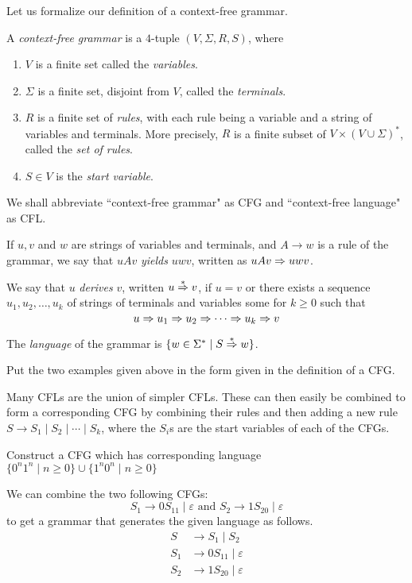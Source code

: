 \vspace{3mm}
Let us formalize our definition of a context-free grammar.
\begin{fdef}
A \textit{context-free grammar} is a $4$-tuple $(V,\Sigma,R,S)$, where
\begin{enumerate}
    \item $V$ is a finite set called the \textit{variables}.
    \item $\Sigma$ is a finite set, disjoint from $V$, called the \textit{terminals}.
    \item $R$ is a finite set of \textit{rules}, with each rule being a variable and a string of variables and terminals. More precisely, $R$ is a finite subset of $V\times (V\cup\Sigma)^*$, called the \textit{set of rules}.
    \item $S\in V$ is the \textit{start variable}.
\end{enumerate}
\end{fdef}

We shall abbreviate ``context-free grammar" as CFG and ``context-free language" as CFL.

If $u,v$ and $w$ are strings of variables and terminals, and $A\to w$ is a rule of the grammar, we say that $uAv$ \textit{yields} $uwv$, written as $uAv\Rightarrow uwv$.

We say that $u$ \textit{derives} $v$, written $u\overset{*}{\Rightarrow} v$, if $u=v$ or there exists a sequence $u_1,u_2,\ldots,u_k$ of strings of terminals and variables some for $k\geq 0$ such that $$u\Rightarrow u_1\Rightarrow u_2 \Rightarrow\cdots\Rightarrow u_k\Rightarrow v$$

The \textit{language} of the grammar is $\{w\in\Sigma^*\mid S\overset{*}{\Rightarrow} w\}$.

\begin{exercise}
Put the two examples given above in the form given in the definition of a CFG.
\end{exercise}

Many CFLs are the union of simpler CFLs. These can then easily be combined to form a corresponding CFG by combining their rules and then adding a new rule $S\to S_1\mid S_2\mid\cdots\mid S_k$, where the $S_i$s are the start variables of each of the CFGs.

\begin{exercise}
Construct a CFG which has corresponding language $\{0^n1^n\mid n\geq 0\}\cup\{1^n0^n\mid n\geq 0\}$
\end{exercise}
\begin{solution}
We can combine the two following CFGs:
$$S_1\to 0S_11\mid\varepsilon \text{ and } S_2\to 1S_20\mid\varepsilon$$
to get a grammar that generates the given language as follows.
\begin{align*}
    S&\to S_1\mid S_2 \\
    S_1&\to 0S_11\mid\varepsilon \\
    S_2&\to 1S_20\mid\varepsilon
\end{align*}
\end{solution}

